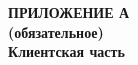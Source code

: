 \begin{center}
\textbf{
\MakeUppercase{Приложение А}\\
(обязательное)\\
Клиентская часть}
\end{center}



\newpage